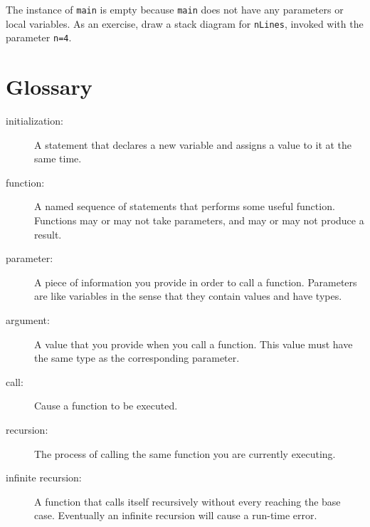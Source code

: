 The instance of {\tt main} is empty because {\tt main} does not
have any parameters or local variables.  As an exercise, draw a
stack diagram for {\tt nLines}, invoked with the parameter {\tt n=4}.



\section{Glossary}

\begin{description}

\item[initialization:]  A statement that declares a new variable
and assigns a value to it at the same time.

\item[function:]  A named sequence of statements that performs some
useful function.  Functions may or may not take parameters, and may
or may not produce a result.

\item[parameter:]  A piece of information you provide
in order to call a function.  Parameters are like variables in
the sense that they contain values and have types.

\item[argument:]  A value that you provide when you call a
function.  This value must have the same type as the corresponding
parameter.

\item[call:]  Cause a function to be executed.

\item[recursion:]  The process of calling the same function you
are currently executing.

\item[infinite recursion:]  A function that calls itself
recursively without every reaching the base case.  Eventually
an infinite recursion will cause a run-time error.


\end{description}


